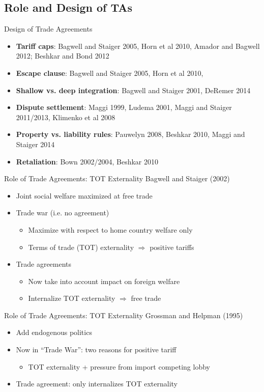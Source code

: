 \documentclass{beamer}
\begin{document}
\subsection{Role and Design of TAs}
\begin{frame}{Design of Trade Agreements}
\pause
\begin{itemize}[<+->]
	\item \textbf{Tariff caps}: Bagwell and Staiger 2005, Horn et al 2010, Amador and Bagwell 2012; Beshkar and Bond 2012
	\item \textbf{Escape clause}: Bagwell and Staiger 2005, Horn et al 2010, 
	\item \textbf{Shallow vs. deep integration}: Bagwell and Staiger 2001, DeRemer 2014
	\item \textbf{Dispute settlement}: Maggi 1999, Ludema 2001, Maggi and Staiger 2011/2013, Klimenko et al 2008
	\item \textbf{Property vs. liability rules}: Pauwelyn 2008, Beshkar 2010, Maggi and Staiger 2014
	\item \textbf{Retaliation}: Bown 2002/2004, Beshkar 2010
\end{itemize}
\end{frame} 


\begin{frame}{Role of Trade Agreements: TOT Externality}
\pause
Bagwell and Staiger (2002)
\pause
\begin{itemize}[<+->]
	\item Joint social welfare maximized at free trade
	\item Trade war (i.e. no agreement)
		\begin{itemize}
			\item Maximize with respect to home country welfare only
			\item Terms of trade (TOT) externality $\Rightarrow$ positive tariffs  
		\end{itemize}
	\item Trade agreements
    \begin{itemize}
			\item Now take into account impact on foreign welfare
			\item Internalize TOT externality $\Rightarrow$ free trade
    \end{itemize}
\end{itemize}
\end{frame} 

 
\begin{frame}{Role of Trade Agreements: TOT Externality}
\pause
Grossman and Helpman (1995)
\pause
\begin{itemize}[<+->]
	\item Add endogenous politics
	\item Now in ``Trade War'': two reasons for positive tariff
		\begin{itemize}
			\item TOT externality + pressure from import competing lobby
		\end{itemize}
	
	\item Trade agreement: only internalizes TOT externality
\end{itemize}
\end{frame} 
\end{document}
